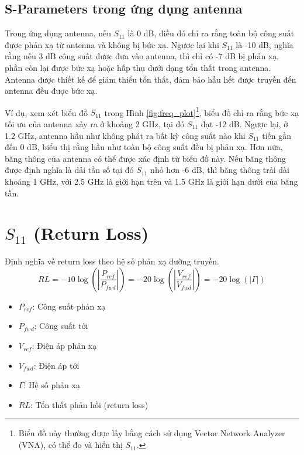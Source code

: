        \subsection{S-Parameters trong ứng dụng antenna}
            Trong ứng dụng antenna, nếu $S_{11}$ là 0 dB, điều đó chỉ ra rằng
            toàn bộ công suất được phản xạ từ antenna và không bị bức xạ.
            Ngược lại khi $S_{11}$ là -10 dB, nghĩa rằng nếu 3 dB công suất được
            đưa vào antenna, thì chỉ có -7 dB bị phản xạ, phần còn lại được bức xạ 
            hoặc hấp thụ dưới dạng tổn thất trong antenna. Antenna được thiết kế
            để giảm thiểu tổn thất, đảm bảo hầu hết được truyền đến antenna đều được bức xạ.\cite{cadence2023sparams}

            Ví dụ, xem xét biểu đồ $S_{11}$ trong Hình \ref{fig:freq_plot}\footnote{Biểu đồ này thường được lấy bằng cách sử dụng Vector Network Analyzer (VNA), 
            có thể đo và hiển thị $S_{11}$.}, biểu đồ chỉ ra rằng bức xạ tối ưu của antenna xảy ra ở khoảng 2 GHz, tại đó $S_{11}$ đạt -12 dB. 
            Ngược lại, ở 1.2 GHz, antenna hầu như không phát ra bất kỳ công suất nào khi $S_{11}$ tiến gần đến 0 dB, biểu thị rằng hầu như 
            toàn bộ công suất đều bị phản xạ. Hơn nữa, băng thông của antenna có thể được xác định từ biểu đồ này. Nếu băng thông được 
            định nghĩa là dải tần số tại đó $S_{11}$ nhỏ hơn -6 dB, thì băng thông trải dài khoảng 1 GHz, với 2.5 GHz là giới hạn trên và 
            1.5 GHz là giới hạn dưới của băng tần.

    

    \section{$S_{11}$ (Return Loss)}
        Định nghĩa về return loss theo hệ số phản xạ đường truyền.
        $$RL = -10\log\left(\left|\frac{P_{ref}}{P_{fwd}}\right|\right) = -20\log\left(\left|\frac{V_{ref}}{V_{fwd}}\right|\right) = -20\log\left(\left|\Gamma\right|\right)$$
        \begin{itemize}
            \item $P_{ref}$: Công suất phản xạ
            \item $P_{fwd}$: Công suất tới
            \item $V_{ref}$: Điện áp phản xạ
            \item $V_{fwd}$: Điện áp tới
            \item $\Gamma$: Hệ số phản xạ
            \item $RL$: Tổn thất phản hồi (return loss)
        \end{itemize}


